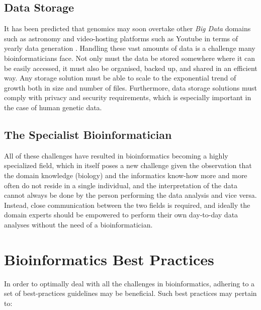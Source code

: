 \begin{justify}
\subsection{Data Storage}

It has been predicted that genomics may soon overtake other \emph{Big Data} domains such as astronomy and video-hosting platforms such as Youtube in terms of yearly data generation \cite{Stephens2015}. Handling these vast amounts of data is a challenge many bioinformaticians face. Not only must the data be stored somewhere where it can be easily accessed, it must also be organised, backed up, and shared in an efficient way. Any storage solution must be able to scale to the exponential trend of growth both in size and number of files. Furthermore, data storage solutions must comply with privacy and security requirements, which is especially important in the case of human genetic data.


\subsection{The Specialist Bioinformatician}
All of these challenges have resulted in bioinformatics becoming a highly specialized field, which in itself poses a new challenge given the observation that the domain knowledge (biology) and the informatics know-how more and more often do not reside in a single individual, and the interpretation of the data cannot always be done by the person performing the data analysis and vice versa. Instead, close communication between the two fields is required, and ideally the domain experts should be empowered to perform their own day-to-day data analyses without the need of a bioinformatician.


\section{Bioinformatics Best Practices}

In order to optimally deal with all the challenges in bioinformatics, adhering to a set of best-practices guidelines may be beneficial. Such best practices may pertain to:


\end{justify}
